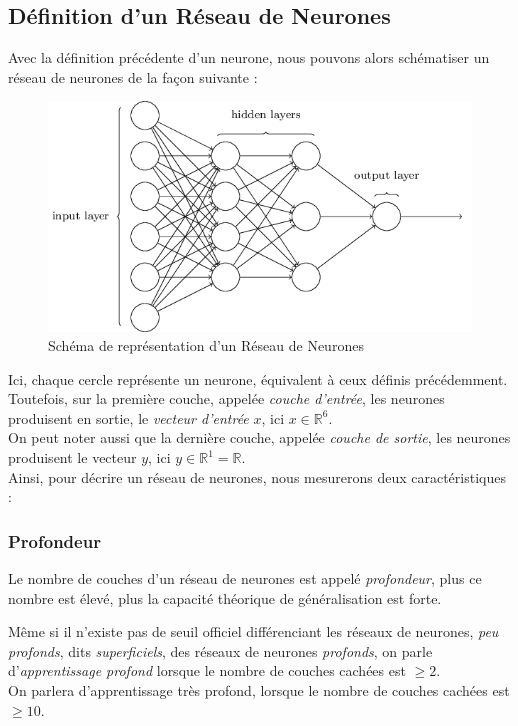 \documentclass[10pt,a4paper]{report}
\begin{document}
		\subsection{Définition d'un Réseau de Neurones}
		Avec la définition précédente d'un neurone, nous pouvons alors schématiser un réseau de neurones de la façon suivante :
		\begin{figure}[H]
			\begin{center}
				\includegraphics[scale=0.5]{Images/neuralnetwork.png}
				\caption{Schéma de représentation d'un Réseau de Neurones}
			\end{center}
		\end{figure}
		Ici, chaque cercle représente un neurone, équivalent à ceux définis précédemment.\\
		Toutefois, sur la première couche, appelée \emph{couche d'entrée}, les neurones produisent en sortie, le \emph{vecteur d'entrée} $x$, ici $x \in \mathbb{R}^6$.\\
		On peut noter aussi que la dernière couche, appelée \emph{couche de sortie}, les neurones produisent le vecteur $y$, ici $y\in \mathbb{R}^1 = \mathbb{R}$.\\
		Ainsi, pour décrire un réseau de neurones, nous mesurerons deux caractéristiques :
		\subsubsection{Profondeur}
		\begin{center}
			Le nombre de couches d'un réseau de neurones est appelé \emph{profondeur}, plus ce nombre est élevé, plus la capacité théorique de généralisation est forte.
		\end{center}
		Même si il n'existe pas de seuil officiel différenciant les réseaux de neurones, \emph{peu profonds}, dits \emph{superficiels}, des réseaux de neurones \emph{profonds}, on parle d'\emph{apprentissage profond} lorsque le nombre de couches cachées est $\geq 2$.\\
		On parlera d'apprentissage très profond, lorsque le nombre de couches cachées est $\geq 10$.\\
\end{document}
